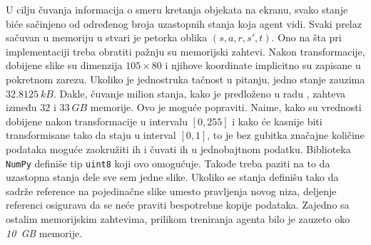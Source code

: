 U cilju čuvanja informacija o smeru kretanja objekata na ekranu, svako stanje biće sačinjeno od određenog broja uzastopnih stanja koja agent vidi. Svaki prelaz sačuvan u memoriju u stvari je petorka oblika $(s, a, r, s', t)$. 
Ono na šta pri implementaciji treba obratiti pažnju su memorijski zahtevi. Nakon transformacije, dobijene slike su dimenzija $105 \times 80$ i njihove koordinate implicitno su zapisane u pokretnom zarezu. Ukoliko je jednostruka tačnost u pitanju, jedno stanje zauzima $32.8125~kB$. Dakle, čuvanje milion stanja, kako je predloženo u radu \cite{dqn_dm}, zahteva između $32$ i $33~GB$ memorije. Ovo je moguće popraviti. Naime, kako su vrednosti dobijene nakon transformacije u intervalu $[0, 255]$ i kako će kasnije biti transformisane tako da staju u interval $[0, 1]$, to je bez gubitka značajne količine podataka moguće zaokružiti ih i čuvati ih u jednobajtnom podatku. Biblioteka \texttt{NumPy} definiše tip \texttt{uint8} koji ovo omogućuje. Takođe treba paziti na to da uzastopna stanja dele sve sem jedne slike. Ukoliko se stanja definišu tako da sadrže reference na pojedinačne slike umesto pravljenja novog niza, deljenje referenci osigurava da se neće praviti bespotrebne kopije podataka. Zajedno sa ostalim memorijskim zahtevima, prilikom treniranja agenta bilo je zauzeto oko {\em 10~GB} memorije.

